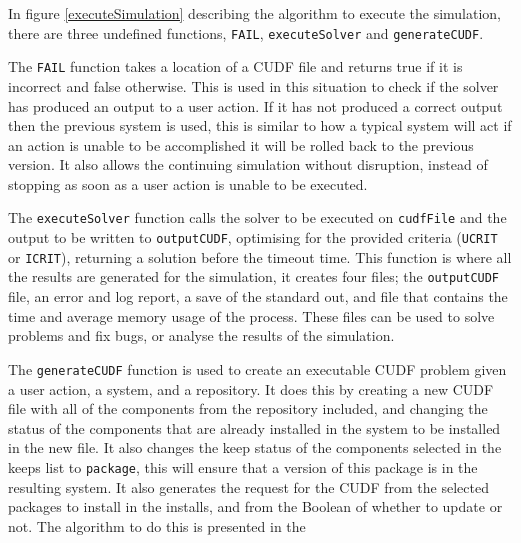 In figure \ref{executeSimulation} describing the algorithm to execute the simulation, there are three undefined functions, \verb+FAIL+, \verb+executeSolver+ and \verb+generateCUDF+.

The \verb+FAIL+ function takes a location of a CUDF file and returns true if it is incorrect and false otherwise.
This is used in this situation to check if the solver has produced an output to a user action.
If it has not produced a correct output then the previous system is used, 
this is similar to how a typical system will act if an action is unable to be accomplished it will be rolled back to the previous version.
It also allows the continuing simulation without disruption, instead of stopping as soon as a user action is unable to be executed.

The \verb+executeSolver+ function calls the solver to be executed on \verb+cudfFile+ and the output to be written to \verb+outputCUDF+, 
optimising for the provided criteria (\verb+UCRIT+ or \verb+ICRIT+), returning a solution before the timeout time.
This function is where all the results are generated for the simulation, it creates four files;
the \verb+outputCUDF+ file, an error and log report, a save of the standard out, and file that contains the time and average memory usage of the process.
These files can be used to solve problems and fix bugs, or analyse the results of the simulation.

The \verb+generateCUDF+ function is used to create an executable CUDF problem given a user action, a system, and a repository.
It does this by creating a new CUDF file with all of the components from the repository included, 
and changing the status of the components that are already installed in the system to be installed in the new file.
It also changes the keep status of the components selected in the keeps list to \verb+package+, this will ensure that a version of this package is in the resulting system.
It also generates the request for the CUDF from the selected packages to install in the installs, 
and from the Boolean of whether to update or not.
The algorithm to do this is presented in the 

